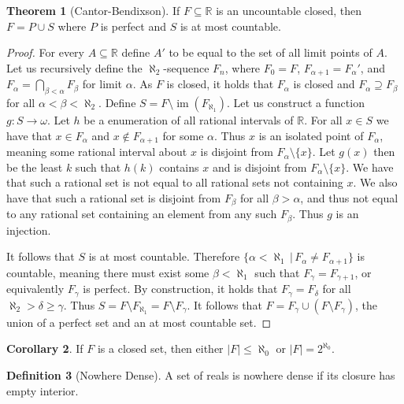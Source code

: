 \documentclass{article}
\theoremstyle{definition}
\newtheorem{thm}{Theorem}[section]
\newtheorem{crly}[thm]{Corollary}
\newtheorem{defn}[thm]{Definition}
\newcommand{\R}{\mathbb{R}}
\DeclareMathOperator{\im}{im}
\newcommand{\abs}[1]{\lvert#1\rvert}
\begin{document}
\begin{thm}[Cantor-Bendixson]
    If $F \subseteq \R$ is an uncountable closed, then $F = P \cup S$ where $P$ is perfect and $S$ is at most countable.
\end{thm}

\begin{proof}
    For every $A \subseteq \R$ define $A'$ to be equal to the set of all limit points of $A$. Let us recursively define the $\aleph_2$-sequence $F_n$, where $F_0 = F$, $F_{\alpha + 1} = F_{\alpha}'$, and $F_{\alpha} = \bigcap_{\beta < \alpha} F_{\beta}$ for limit $\alpha$. As $F$ is closed, it holds that $F_\alpha$ is closed and $F_\alpha \supseteq F_{\beta}$ for all $\alpha < \beta < \aleph_2$. Define $S = F \setminus \im(F_{\aleph_1})$. Let us construct a function $g: S \to \omega$. Let $h$ be a enumeration of all rational intervals of $\R$. For all $x \in S$ we have that $x \in F_\alpha$ and $x \not\in F_{\alpha + 1}$ for some $\alpha$. Thus $x$ is an isolated point of $F_\alpha$, meaning some rational interval about $x$ is disjoint from $F_\alpha \setminus \{x\}$. Let $g(x)$ then be the least $k$ such that $h(k)$ contains $x$ and is disjoint from $F_\alpha \setminus \{x\}$. We have that such a rational set is  not equal to all rational sets not containing $x$. We also have that such a rational set is disjoint from $F_\beta$ for all $\beta > \alpha$, and thus not equal to any rational set containing an element from any such $F_\beta$. Thus $g$ is an injection. 

    It follows that $S$ is at most countable. Therefore $\{\alpha < \aleph_1 \, | \, F_\alpha \ne F_{\alpha + 1} \}$ is countable, meaning there must exist some $\beta < \aleph_1$ such that $F_{\gamma} = F_{\gamma + 1}$, or equivalently $F_\gamma$ is perfect. By construction, it holds that $F_\gamma = F_\delta$ for all $\aleph_2 > \delta \ge \gamma$. Thus $S = F \setminus F_{\aleph_1} = F \setminus F_\gamma$. It follows that $F = F_\gamma \cup (F \setminus F_\gamma)$, the union of a perfect set and an at most countable set.
\end{proof}

\begin{crly}
    If $F$ is a closed set, then  either $\abs{F} \le \aleph_0$ or $\abs{F} = 2^{\aleph_0}$. 
\end{crly}

\begin{defn}[Nowhere Dense]
    A set of reals is nowhere dense if its closure has empty interior.
\end{defn}
\end{document}
